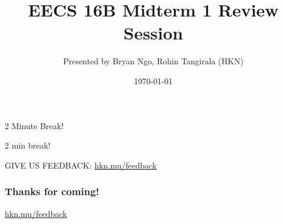 

\title{EECS 16B Midterm 1 Review Session}
\author{Presented by Bryan Ngo, Rohin Tangirala (HKN)}
\date{\today}

\newcommand{\SlideAccessingLogistics}{@1046}









\begin{frame}
    2 Minute Break!
\end{frame}




\begin{frame}
    2 min break!

      GIVE US FEEDBACK: \url{hkn.mu/feedback}
\end{frame}







\begin{frame}
    \frametitle{Thanks for coming!}
    \href{https://hkn.mu/feedback}{hkn.mu/feedback}
\end{frame}


